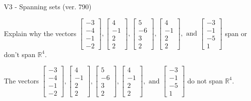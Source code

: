 \begin{exercise}
  \begin{exerciseTitle}V3 - Spanning sets (ver. 790)\end{exerciseTitle}
  \begin{exerciseStatement}
    Explain why the vectors \(\left[\begin{array}{r}
-3 \\
-4 \\
-1 \\
-2
\end{array}\right] , \left[\begin{array}{r}
4 \\
-1 \\
2 \\
2
\end{array}\right] , \left[\begin{array}{r}
5 \\
-6 \\
3 \\
2
\end{array}\right] , \left[\begin{array}{r}
4 \\
-1 \\
2 \\
2
\end{array}\right] , \text{ and } \left[\begin{array}{r}
-3 \\
-1 \\
-5 \\
1
\end{array}\right]\) span or don't span \(\mathbb{R}^4\). 
	


  \end{exerciseStatement}
  \begin{exerciseAnswer}
   The vectors \(\left[\begin{array}{r}
-3 \\
-4 \\
-1 \\
-2
\end{array}\right] , \left[\begin{array}{r}
4 \\
-1 \\
2 \\
2
\end{array}\right] , \left[\begin{array}{r}
5 \\
-6 \\
3 \\
2
\end{array}\right] , \left[\begin{array}{r}
4 \\
-1 \\
2 \\
2
\end{array}\right] , \text{ and } \left[\begin{array}{r}
-3 \\
-1 \\
-5 \\
1
\end{array}\right]\) 
  	 do not  
	span \(\mathbb{R}^4\).
  



\end{exerciseAnswer}
\end{exercise}
